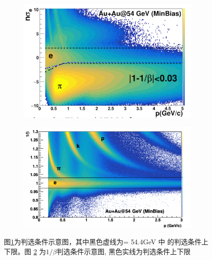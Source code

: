 \begin{figure}[htb]
    \centering
    \begin{subfigure}[b]{0.45\textwidth}
        \centering
        \includegraphics[width=\textwidth,clip]{figures/Chapter4/nSigmaEwTOF.png}
        \caption{}
        \label{fig:nSigmaEwTOF}
    \end{subfigure}
    \hfill
    \begin{subfigure}[b]{0.49\textwidth}
        \centering
        \includegraphics[width=\textwidth,clip]{figures/Chapter4/beta_Cut.png}
        \caption{}
        \label{fig:beta_Cut}
    \end{subfigure}
       \caption[\nSigmaE 和 $1/\beta$判选条件示意图]{图\ref{fig:nSigmaEwTOF}为\nSigmaE 判选条件示意图，其中黑色虚线为\sNN = 54.4GeV 中 \nSigmaE 的判选条件上下限。图 \ref{fig:beta_Cut} 为$1/\beta$判选条件示意图, 黑色实线为判选条件上下限 }
       \label{fig:eID_cut}
\end{figure}